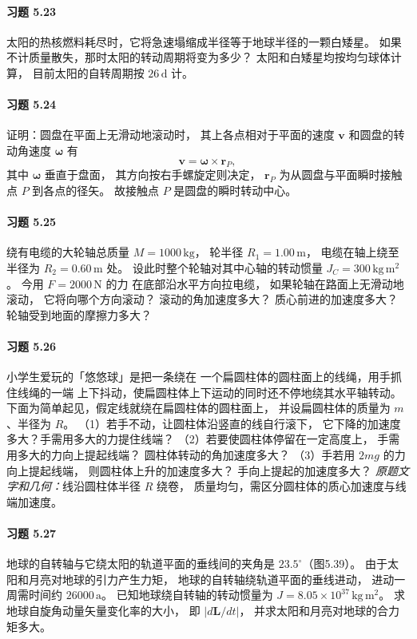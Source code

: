 \paragraph{习题 5.23}
太阳的热核燃料耗尽时，它将急速塌缩成半径等于地球半径的一颗白矮星。
如果不计质量散失，那时太阳的转动周期将变为多少？
太阳和白矮星均按均匀球体计算，
目前太阳的自转周期按 \(26\,\mathrm d\) 计。

\paragraph{习题 5.24}
证明：圆盘在平面上无滑动地滚动时，
其上各点相对于平面的速度 \(\boldsymbol v\)
和圆盘的转动角速度 \(\boldsymbol\omega\) 有
\[
 \boldsymbol v=\boldsymbol\omega\times\boldsymbol r_P,
\]
其中 \(\boldsymbol\omega\) 垂直于盘面，
其方向按右手螺旋定则决定，
\(\boldsymbol r_P\) 为从圆盘与平面瞬时接触点 \(P\)
到各点的径矢。
故接触点 \(P\) 是圆盘的瞬时转动中心。

\paragraph{习题 5.25}
绕有电缆的大轮轴总质量
\(M=1000\,\mathrm{kg}\)，
轮半径 \(R_1=1.00\,\mathrm m\)，
电缆在轴上绕至半径为
\(R_2=0.60\,\mathrm m\) 处。
设此时整个轮轴对其中心轴的转动惯量
\(J_C=300\,\mathrm{kg\,m^2}\)。
今用 \(F=2000\,\mathrm N\) 的力
在底部沿水平方向拉电缆，
如果轮轴在路面上无滑动地滚动，
它将向哪个方向滚动？
滚动的角加速度多大？
质心前进的加速度多大？
轮轴受到地面的摩擦力多大？

\paragraph{习题 5.26}
小学生爱玩的「悠悠球」是把一条绕在
一个扁圆柱体的圆柱面上的线绳，用手抓住线绳的一端
上下抖动，使扁圆柱体上下运动的同时还不停地绕其水平轴转动。
下面为简单起见，假定线就绕在扁圆柱体的圆柱面上，
并设扁圆柱体的质量为 \(m\)、半径为 \(R\)。
（1）若手不动，让圆柱体沿竖直的线自行滚下，
它下降的加速度多大？手需用多大的力提住线端？
（2）若要使圆柱体停留在一定高度上，
手需用多大的力向上提起线端？
圆柱体转动的角加速度多大？
（3）手若用 \(2mg\) 的力向上提起线端，
则圆柱体上升的加速度多大？
手向上提起的加速度多大？
\textit{原题文字和几何：}线沿圆柱体半径 \(R\) 绕卷，
质量均匀，需区分圆柱体的质心加速度与线端加速度。

\paragraph{习题 5.27}
地球的自转轴与它绕太阳的轨道平面的垂线间的夹角是
\(23.5^\circ\)（图5.39）。
由于太阳和月亮对地球的引力产生力矩，
地球的自转轴绕轨道平面的垂线进动，
进动一周需时间约 \(26000\,\mathrm a\)。
已知地球绕自转轴的转动惯量为
\(J=8.05\times10^{37}\,\mathrm{kg\,m^2}\)。
求地球自旋角动量矢量变化率的大小，
即 \(|d\boldsymbol L/dt|\)，
并求太阳和月亮对地球的合力矩多大。

